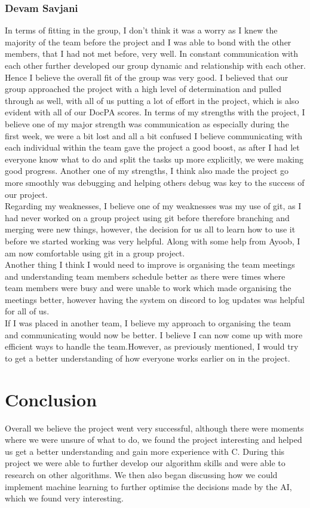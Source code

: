 \documentclass[10pt]{article}
\begin{document}
\subsubsection{Devam Savjani}
In terms of fitting in the group, I don’t think it was a worry as I knew the majority of the team before the project and I was able to bond with the other members, that I had not met before, very well. In constant communication with each other further developed our group dynamic and relationship with each other. Hence I believe the overall fit of the group was very good. I believed that our group approached the project with a high level of determination and pulled through as well, with all of us putting a lot of effort in the project, which is also evident with all of our DocPA scores.
In terms of my strengths with the project, I believe one of my major strength was communication as especially during the first week, we were a bit lost and all a bit confused I believe communicating with each individual within the team gave the project a good boost, as after I had let everyone know what to do and split the tasks up more explicitly, we were making good progress. Another one of my strengths, I think also made the project go more smoothly was debugging and helping others debug was key to the success of our project.
\\Regarding my weaknesses, I believe one of my weaknesses was my use of git, as I had never worked on a group project using git before therefore branching and merging were new things, however, the decision for us all to learn how to use it before we started working was very helpful. Along with some help from Ayoob, I am now comfortable using git in a group project.
\\Another thing I think I would need to improve is organising the team meetings and understanding team members schedule better as there were times where team members were busy and were unable to work which made organising the meetings better, however having the system on discord to log updates was helpful for all of us.
\\If I was placed in another team, I believe my approach to organising the team and communicating would now be better. I believe I can now come up with more efficient ways to handle the team.However, as previously mentioned, I would try to get a better understanding of how everyone works earlier on in the project.
\section{Conclusion}
Overall we believe the project went very successful, although there were moments where we were unsure of what to do, we found the project interesting and helped us get a better understanding and gain more experience with C. During this project we were able to further develop our algorithm skills and were able to research on other algorithms. We then also began discussing how we could implement machine learning to further optimise the decisions made by the AI, which we found very interesting.
\end{document}
